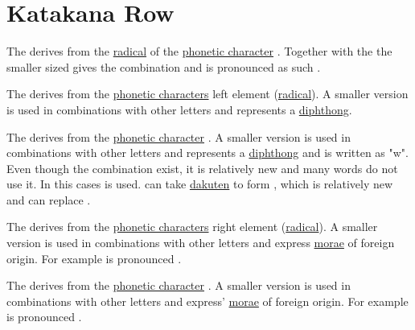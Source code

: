 \section{Katakana  Row}\label{sec:KatakanaARow}


\label{letter:a} The \jkatakana{}  derives from
the \hyperref[sec:Radical]{radical} of the
\hyperref[sec:PhoneticCharacter]{phonetic character} .
Together with the \jkatakana{}   the smaller sized
 gives the combination  and is
pronounced as such .

\label{letter:i} The \jkatakana{}  derives from
the \hyperref[sec:PhoneticCharacter]{phonetic characters} 
left element (\hyperref[sec:Radical]{radical}). A smaller version
 is used in combinations with other letters and represents a
\hyperref[sec:Diphthong]{diphthong}.

\label{letter:u} The \jkatakana{}  derives from
the \hyperref[sec:PhoneticCharacter]{phonetic character} . A
smaller version  is used in combinations with other letters
and represents a \hyperref[sec:Diphthong]{diphthong} and is written as "w".
Even though the combination   exist, it is
relatively new and many words do not use it. In this cases 
 is used.  can take \hyperref[sec:Dakuten]{dakuten}
to form  , which is relatively new and can replace
 .



\newpage

\label{letter:e} The \jkatakana{}  derives from
the \hyperref[sec:PhoneticCharacter]{phonetic characters} 
right element (\hyperref[sec:Radical]{radical}). A smaller version
 is used in combinations with other letters and express
\hyperref[sec:Mora]{morae} of foreign origin. For example 
is pronounced .

\label{letter:o} The \jkatakana{}  derives from
the \hyperref[sec:PhoneticCharacter]{phonetic character} . A
smaller version  is used in combinations with other letters
and express' \hyperref[sec:Mora]{morae} of foreign origin. For example
 is pronounced .

